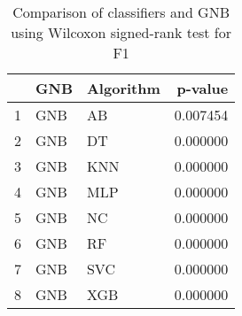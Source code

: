 \begin{table}
\footnotesize
\caption{Comparison of classifiers and GNB using Wilcoxon signed-rank test for F1}
\label{tab:GNB wilcoxon F1 comparison}
\begin{tabular}{lllr}
\hline
 & GNB & Algorithm & p-value \\
\hline
1 & GNB & AB & 0.007454 \\
2 & GNB & DT & 0.000000 \\
3 & GNB & KNN & 0.000000 \\
4 & GNB & MLP & 0.000000 \\
5 & GNB & NC & 0.000000 \\
6 & GNB & RF & 0.000000 \\
7 & GNB & SVC & 0.000000 \\
8 & GNB & XGB & 0.000000 \\
\hline
\end{tabular}
\end{table}
